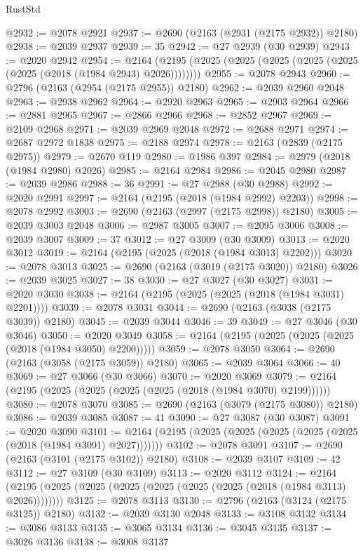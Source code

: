 \begin{lexlean}{RustStd}
\begin{coremodule}
@2932 := @2078 @2921
@2937 := @2690 (@2163 (@2931 (@2175 @2932)) @2180)
@2938 := @2039 @2937
@2939 := 35
@2942 := @27 @2939 (@30 @2939)
@2943 := @2020 @2942
@2954 := @2164 (@2195 (@2025 (@2025 (@2025 (@2025 (@2025 (@2025 (@2018 (@1984 @2943) @2026))))))))
@2955 := @2078 @2943
@2960 := @2796 (@2163 (@2954 (@2175 @2955)) @2180)
@2962 := @2039 @2960 @2048
@2963 := @2938 @2962
@2964 := @2920 @2963
@2965 := @2903 @2964
@2966 := @2881 @2965
@2967 := @2866 @2966
@2968 := @2852 @2967
@2969 := @2109 @2968
@2971 := @2039 @2969 @2048
@2972 := @2688 @2971
@2974 := @2687 @2972 @1838
@2975 := @2188 @2974
@2978 := @2163 (@2839 (@2175 @2975))
@2979 := @2670 @119
@2980 := @1986 @397
@2984 := @2979 (@2018 (@1984 @2980) @2026)
@2985 := @2164 @2984
@2986 := @2045 @2980
@2987 := @2039 @2986
@2988 := 36
@2991 := @27 @2988 (@30 @2988)
@2992 := @2020 @2991
@2997 := @2164 (@2195 (@2018 (@1984 @2992) @2203))
@2998 := @2078 @2992
@3003 := @2690 (@2163 (@2997 (@2175 @2998)) @2180)
@3005 := @2039 @3003 @2048
@3006 := @2987 @3005
@3007 := @2095 @3006
@3008 := @2039 @3007
@3009 := 37
@3012 := @27 @3009 (@30 @3009)
@3013 := @2020 @3012
@3019 := @2164 (@2195 (@2025 (@2018 (@1984 @3013) @2202)))
@3020 := @2078 @3013
@3025 := @2690 (@2163 (@3019 (@2175 @3020)) @2180)
@3026 := @2039 @3025
@3027 := 38
@3030 := @27 @3027 (@30 @3027)
@3031 := @2020 @3030
@3038 := @2164 (@2195 (@2025 (@2025 (@2018 (@1984 @3031) @2201))))
@3039 := @2078 @3031
@3044 := @2690 (@2163 (@3038 (@2175 @3039)) @2180)
@3045 := @2039 @3044
@3046 := 39
@3049 := @27 @3046 (@30 @3046)
@3050 := @2020 @3049
@3058 := @2164 (@2195 (@2025 (@2025 (@2025 (@2018 (@1984 @3050) @2200)))))
@3059 := @2078 @3050
@3064 := @2690 (@2163 (@3058 (@2175 @3059)) @2180)
@3065 := @2039 @3064
@3066 := 40
@3069 := @27 @3066 (@30 @3066)
@3070 := @2020 @3069
@3079 := @2164 (@2195 (@2025 (@2025 (@2025 (@2025 (@2018 (@1984 @3070) @2199))))))
@3080 := @2078 @3070
@3085 := @2690 (@2163 (@3079 (@2175 @3080)) @2180)
@3086 := @2039 @3085
@3087 := 41
@3090 := @27 @3087 (@30 @3087)
@3091 := @2020 @3090
@3101 := @2164 (@2195 (@2025 (@2025 (@2025 (@2025 (@2025 (@2018 (@1984 @3091) @2027)))))))
@3102 := @2078 @3091
@3107 := @2690 (@2163 (@3101 (@2175 @3102)) @2180)
@3108 := @2039 @3107
@3109 := 42
@3112 := @27 @3109 (@30 @3109)
@3113 := @2020 @3112
@3124 := @2164 (@2195 (@2025 (@2025 (@2025 (@2025 (@2025 (@2025 (@2018 (@1984 @3113) @2026))))))))
@3125 := @2078 @3113
@3130 := @2796 (@2163 (@3124 (@2175 @3125)) @2180)
@3132 := @2039 @3130 @2048
@3133 := @3108 @3132
@3134 := @3086 @3133
@3135 := @3065 @3134
@3136 := @3045 @3135
@3137 := @3026 @3136
@3138 := @3008 @3137

\end{coremodule}
\end{lexlean}
